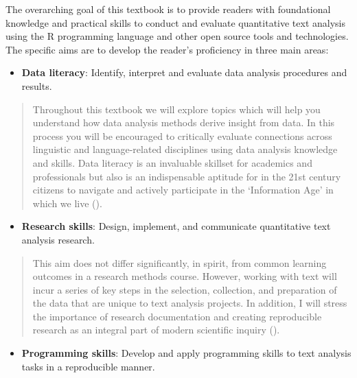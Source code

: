 \documentclass[
  letterpaper,
]{book}
\providecommand{\tightlist}{%
  \setlength{\itemsep}{0pt}\setlength{\parskip}{0pt}}\usepackage{longtable,booktabs,array}
\theoremstyle{definition}
\theoremstyle{remark}
\begin{document}
The overarching goal of this textbook is to provide readers with
foundational knowledge and practical skills to conduct and evaluate
quantitative text analysis using the R programming language and other
open source tools and technologies. The specific aims are to develop the
reader's proficiency in three main areas:

\begin{itemize}
\tightlist
\item
  \textbf{Data literacy}: Identify, interpret and
  evaluate data analysis procedures and results.
\end{itemize}

\begin{quote}
Throughout this textbook we will explore topics which will help you
understand how data analysis methods derive insight from data. In this
process you will be encouraged to critically evaluate connections across
linguistic and language-related disciplines using data analysis
knowledge and skills. Data literacy is an invaluable skillset for
academics and professionals but also is an indispensable aptitude for in
the 21st century citizens to navigate and actively participate in the
`Information Age' in which we live ().
\end{quote}

\begin{itemize}
\tightlist
\item
  \textbf{Research skills}: Design, implement, and communicate
  quantitative text analysis research.
\end{itemize}

\begin{quote}
This aim does not differ significantly, in spirit, from common learning
outcomes in a research methods course. However, working with text will
incur a series of key steps in the selection, collection, and
preparation of the data that are unique to text analysis projects. In
addition, I will stress the importance of research documentation and
creating reproducible research as an integral part of modern scientific
inquiry ().
\end{quote}

\begin{itemize}
\tightlist
\item
  \textbf{Programming skills}: Develop and apply programming skills to
  text analysis tasks in a reproducible manner.
\end{itemize}
\end{document}
